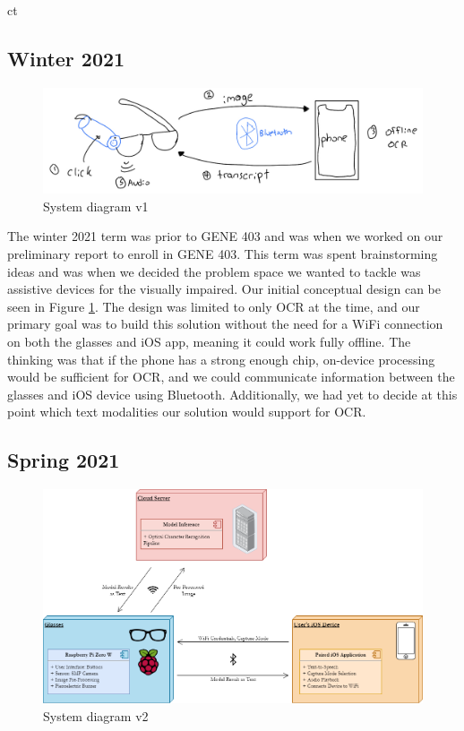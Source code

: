 ct\documentclass[a4paper,11pt]{article}
\begin{document}
\subsection{Winter 2021}
\label{winter-2021-design}
\begin{figure}[H]
\centering
\includegraphics[scale=0.265]{img/system_diagrams/system_diagram_v1.jpeg}
\caption{System diagram v1}
\label{fig:system_diagram_v1}
\end{figure}
The winter 2021 term was prior to GENE 403 and was when we worked on our preliminary report to enroll in GENE 403. This term was spent brainstorming ideas and was when we decided the problem space we wanted to tackle was assistive devices for the visually impaired. Our initial conceptual design can be seen in Figure \ref{fig:system_diagram_v1}. The design was limited to only OCR at the time, and our primary goal was to build this solution without the need for a WiFi connection on both the glasses and iOS app, meaning it could work fully offline. The thinking was that if the phone has a strong enough chip, on-device processing would be sufficient for OCR, and we could communicate information between the glasses and iOS device using Bluetooth. Additionally, we had yet to decide at this point which text modalities our solution would support for OCR.

\subsection{Spring 2021}
\label{spirng-2021-design}
\begin{figure}[H]
\centering
\includegraphics[scale=0.4]{img/system_diagrams/system_diagram_v2.png}
\caption{System diagram v2}
\label{fig:system_diagram_v2}
\end{figure}
\end{document}
